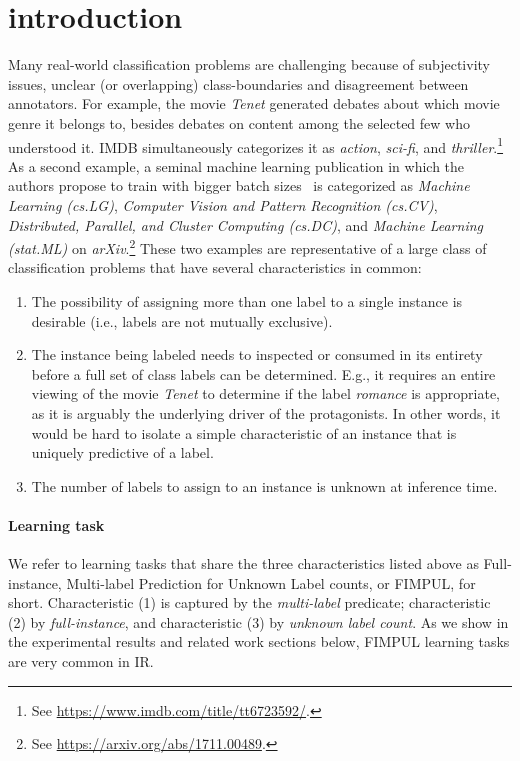 
\section{introduction}
\label{sec:org662677c}


Many real-world classification problems are challenging because of subjectivity issues, unclear (or overlapping) class-boundaries and disagreement between annotators. 
For example, the movie \textit{Tenet} generated debates about which movie genre it belongs to, besides debates on content among the selected few who understood it. IMDB simultaneously categorizes it as \textit{action}, \textit{sci-fi}, and \textit{thriller}.\footnote{See \url{https://www.imdb.com/title/tt6723592/}.} 
As a second example, a seminal machine learning publication in which the authors propose to train with bigger batch sizes~\citep{bigBSArxiv} is categorized as \textit{Machine Learning (cs.LG)},
\textit{Computer Vision and Pattern Recognition (cs.CV)}, \textit{Distributed,
Parallel, and Cluster Computing (cs.DC)}, and \textit{Machine Learning
(stat.ML)} on \textit{arXiv}.\footnote{See \url{https://arxiv.org/abs/1711.00489}.}
These two examples are representative of a large class of classification problems that have several characteristics in common: 
\begin{enumerate}[label=(\arabic*),leftmargin=*]
\item The possibility of assigning more than one label to a single instance is desirable (i.e., labels are not mutually exclusive). 
\item The instance being labeled needs to inspected or consumed in its entirety before a full set of class labels can be determined. E.g., it requires an entire viewing of the movie \textit{Tenet} to determine if the label \textit{romance} is appropriate, as it is arguably the underlying driver of the protagonists. In other words, it would be hard to isolate a simple characteristic of an instance that is uniquely predictive of a label.
\item The number of labels to assign to an instance is unknown at inference time.
\end{enumerate}

\paragraph{Learning task}
We refer to learning tasks that share the three characteristics listed above as Full-instance, Multi-label Prediction for Unknown Label counts, or FIMPUL, for short. 
Characteristic (1) is captured by the \emph{multi-label} predicate; characteristic (2) by \emph{full-instance}, and characteristic (3) by \emph{unknown label count}.
As we show in the experimental results and related work sections below, FIMPUL learning tasks are very common in \ac{IR}.

